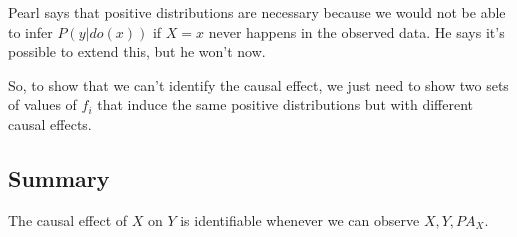 Pearl says that positive distributions are necessary because we would not be able to infer $P(y|do(x))$ if $X=x$ never happens in the observed data. He says it's possible to extend this, but he won't now.

So, to show that we can't identify the causal effect, we just need to show two sets of values of $f_i$ that induce the same positive distributions but with different causal effects.

\subsection{Summary}

The causal effect of $X$ on $Y$ is identifiable whenever we can observe $X,Y,PA_X$.
